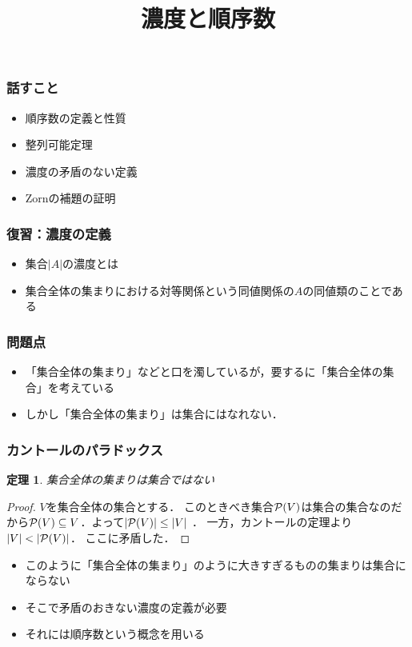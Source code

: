 \documentclass[dvipdfmx,17pt]{beamer}
\title{濃度と順序数}
\renewcommand{\subset}{\subseteq}
\theoremstyle{plain}
\newtheorem{thm}{定理}
\begin{document}
\begin{frame}\frametitle{}
\titlepage
\end{frame}

\begin{frame}\frametitle{話すこと}
\begin{itemize}
\item 順序数の定義と性質
\item 整列可能定理
\item 濃度の矛盾のない定義
\item Zornの補題の証明
\end{itemize}
\end{frame}

\begin{frame}\frametitle{復習：濃度の定義}
\begin{itemize}
\item 集合$|A|$の濃度とは
\item 集合全体の集まりにおける対等関係という同値関係の$A$の同値類のことである
\end{itemize}
\end{frame}

\begin{frame}\frametitle{問題点}
\begin{itemize}
\item 「集合全体の集まり」などと口を濁しているが，要するに「集合全体の集合」を考えている
\item しかし「集合全体の集まり」は集合にはなれない．
\end{itemize}
\end{frame}

\begin{frame}\frametitle{カントールのパラドックス}
\begin{thm}
集合全体の集まりは集合ではない
\end{thm}
\begin{proof}
{\small
$V$を集合全体の集合とする．
このときべき集合${\cal P}(V)$は集合の集合なのだから${\cal P}(V) \subset V$．よって$|{\cal P}(V)| \le |V|$	．
一方，カントールの定理より$|V| < |{\cal P}(V)|$．
ここに矛盾した．}
\end{proof}
\end{frame}

\begin{frame}
\begin{itemize}
\item このように「集合全体の集まり」のように大きすぎるものの集まりは集合にならない
\item そこで矛盾のおきない濃度の定義が必要
\item それには順序数という概念を用いる
\end{itemize}
\end{frame}
\end{document}
